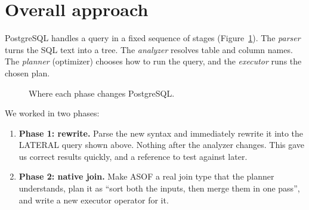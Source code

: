 \documentclass[11pt,a4paper]{article}
\begin{document}
\section{Overall approach}

PostgreSQL handles a query in a fixed sequence of stages (Figure~\ref{fig:pipeline}). The
\emph{parser} turns the SQL text into a tree. The \emph{analyzer} resolves table and
column names. The \emph{planner} (optimizer) chooses how to run the query, and the
\emph{executor} runs the chosen plan.

\begin{figure}[h]
\centering
{}
\caption{Where each phase changes PostgreSQL.}
\label{fig:pipeline}
\end{figure}

We worked in two phases:

\begin{enumerate}
  \item \textbf{Phase 1: rewrite.} Parse the new syntax and immediately rewrite it into
        the LATERAL query shown above. Nothing after the analyzer changes. This gave us
        correct results quickly, and a reference to test against later.
  \item \textbf{Phase 2: native join.} Make ASOF a real join type that the planner
        understands, plan it as ``sort both the inputs, then merge them in one pass'', and
        write a new executor operator for it.
\end{enumerate}
\end{document}
